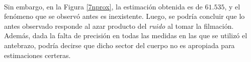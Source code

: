 \documentclass[12pt, twocolumn]{article}
\begin{document}
	\paragraph{} Sin embargo, en la Figura \ref{7nprox}, la estimación obtenida es de $61.535$, y el fenómeno que se observó antes es inexistente. Luego, se podría concluir que lo antes observado responde al azar producto del \textit{ruido} al tomar la filmación. Además, dada la falta de precisión en todas las medidas en las que se utilizó el antebrazo, podría decirse que dicho sector del cuerpo no es apropiada para estimaciones certeras.
	
	
	\newpage
	\begin{thebibliography}{9}
	

	
	\end{thebibliography}
	
\end{document}
